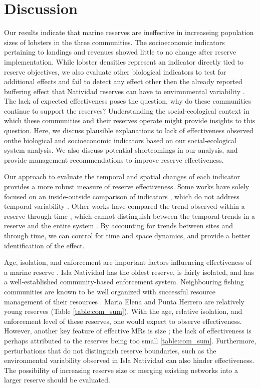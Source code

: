\documentclass{frontiersSCNS}
\theoremstyle{definition}
\theoremstyle{definition}
\theoremstyle{definition}
\theoremstyle{remark}
\begin{document}
\clearpage

\section{Discussion}\label{discussion}

Our results indicate that marine reserves are ineffective in increaseing
population sizes of lobsters in the three communities. The socioeconomic
indicators pertaining to landings and revenues showed little to no
change after reserve implementation. While lobster densities represent
an indicator directly tied to reserve objectives, we also evaluate other
biological indicators to test for additional effects and fail to detect
any effect other then the already reported buffering effect that
Natividad reserves can have to environmental variability
\citep{micheli_2012-EU}. The lack of expected effectiveness poses the
question, why do these communities continue to support the reserves?
Understanding the social-ecological context in which these communities
and their reserves operate might provide insights to this question.
Here, we discuss plausible explanations to lack of effectiveness
observed onthe biological and socioeconomic indicators based on our
social-ecological system analysis. We also discuss potential
shortcomings in our analysis, and provide management recommendations to
improve reserve effectiveness.

Our approach to evaluate the temporal and spatial changes of each
indicator provides a more robust measure of reserve effectiveness. Some
works have solely focused on an inside-outside comparison of indicators
\citep{guidetti_2014-8Z,friedlander_2017-oI,rodriguez_2017-PD}, which do
not address temporal variability \citep{depalma_2018}. Other works have
compared the trend observed within a reserve through time
\citep{betti_2017-lq}, which cannot distinguish between the temporal
trends in a reserve and the entire system \citep{depalma_2018}. By
accounting for trends between sites and through time, we can control for
time and space dynamics, and provide a better identification of the
effect.

Age, isolation, and enforcement are important factors influencing
effectiveness of a marine reserve \citep{edgar_2014-UO}. Isla Natividad
has the oldest reserve, is fairly isolated, and has a well-established
community-based enforcement system. Neighbouring fishing communities are
known to be well organized with successful resource management of their
resources \citep{mccay_2017-1m,mccay_2014-CN}. Maria Elena and Punta
Herrero are relatively young reserves (Table \ref{table:com_sum}). With
the age, relative isolation, and enforcement level of these reserves,
one would expect to observe effectiveness. However, another key feature
of effective MRs is size \citep{edgar_2014-UO}; the lack of
effectiveness is perhaps attributed to the reserves being too small
\ref{table:com_sum}. Furthermore, perturbations that do not distinguish
reserve boundaries, such as the environmental variability observed in
Isla Natividad can also hinder effectiveness. The possibility of
increasing reserve size or merging existing networks into a larger
reserve should be evaluated.
\end{document}
